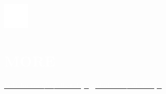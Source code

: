 \documentclass[../main.tex]{subfiles}
\begin{document}
    \hspace*{0.4cm}
    \begin{minipage}[t]{1.75cm}
        \vspace*{1cm}\includegraphics[width=1.25cm]{assets/more.png}
    \end{minipage}
    \begin{minipage}[t]{5cm}

        \vspace*{0.75cm}
        \section*{\textcolor{white}{MORE}}
        \vspace*{-0.25cm}
        \textcolor{white}{
            \vspace*{0.1cm}\underline{\href{https://www.linkedin.com/in/albatalaya}{\textcolor{white}{linkedin.com/in/albatalaya}}}
            \underline{\href{https://www.github.com/albatalaya}{\textcolor{white}{github.com/albatalaya}}}
        }
    \end{minipage}
\end{document}
